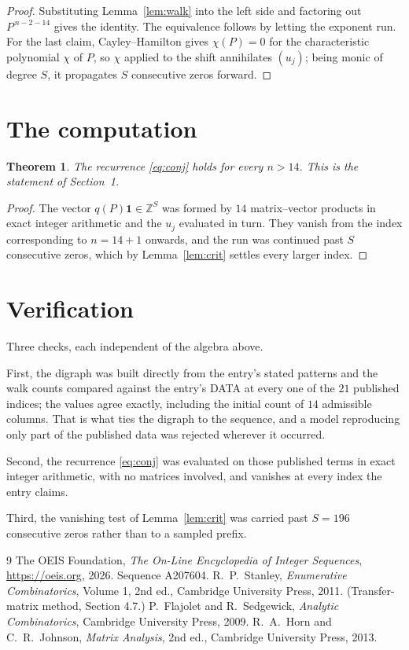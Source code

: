 \documentclass[11pt,a4paper]{article}
\theoremstyle{plain}
\newtheorem{theorem}{Theorem}
\theoremstyle{definition}
\begin{document}
\begin{proof}
Substituting Lemma~\ref{lem:walk} into the left side and factoring out
$P^{\,n-2-14}$ gives the identity. The equivalence follows by letting the exponent
run. For the last claim, Cayley--Hamilton gives $\chi(P)=0$ for the characteristic
polynomial $\chi$ of $P$, so $\chi$ applied to the shift annihilates $(u_j)$; being monic of
degree $S$, it propagates $S$ consecutive zeros forward.
\end{proof}

\section{The computation}

\begin{theorem}
The recurrence \eqref{eq:conj} holds for every $n>14$. This is the statement of
Section~1.
\end{theorem}

\begin{proof}
The vector $q(P)\mathbf{1}\in\mathbb{Z}^{S}$ was formed by $14$ matrix--vector
products in exact integer arithmetic and the $u_j$ evaluated in turn. They vanish from the
index corresponding to $n=14+1$ onwards, and the run was continued past $S$ consecutive
zeros, which by Lemma~\ref{lem:crit} settles every larger index.
\end{proof}

\section{Verification}

Three checks, each independent of the algebra above.

First, the digraph was built directly from the entry's stated patterns and the walk counts
compared against the entry's DATA at every one of the $21$ published indices; the
values agree exactly, including the initial count of $14$ admissible columns. That is
what ties the digraph to the sequence, and a model reproducing only part of the published
data was rejected wherever it occurred.

Second, the recurrence \eqref{eq:conj} was evaluated on those published terms in exact
integer arithmetic, with no matrices involved, and vanishes at every index the entry claims.

Third, the vanishing test of Lemma~\ref{lem:crit} was carried past $S=196$ consecutive
zeros rather than to a sampled prefix.

\begin{thebibliography}{9}
 The OEIS Foundation, \emph{The On-Line Encyclopedia of Integer
Sequences}, \url{https://oeis.org}, 2026. Sequence A207604.
 R.~P.~Stanley, \emph{Enumerative Combinatorics}, Volume 1, 2nd ed.,
Cambridge University Press, 2011. (Transfer-matrix method, Section 4.7.)
 P.~Flajolet and R.~Sedgewick, \emph{Analytic Combinatorics}, Cambridge
University Press, 2009.
 R.~A.~Horn and C.~R.~Johnson, \emph{Matrix Analysis}, 2nd ed., Cambridge
University Press, 2013.
\end{thebibliography}
\end{document}
